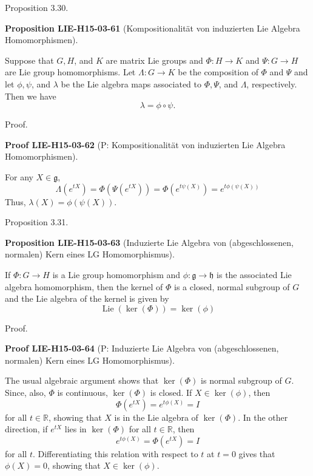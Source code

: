 \documentclass[10pt, letterpaper]{article}
\newcommand{\CustomHeading}[3]{%
  \par\medskip\noindent%
  \textbf{#1 #2} \textnormal{(#3)}.\enskip%
}
\newenvironment{PROP}[2]{\begin{unitbox}\CustomHeading{Proposition}{#1}{#2}}{\end{unitbox}}
\newenvironment{PROOF}[2]{\begin{unitbox}\CustomHeading{Proof}{#1}{#2}}{\end{unitbox}}
\begin{document}
Proposition 3.30. 


\begin{PROP}{LIE-H15-03-61}{Kompositionalität von induzierten Lie Algebra Homomorphismen}
Suppose that $G, H$, and $K$ are matrix Lie groups and $\Phi: H \rightarrow K$ and $\Psi: G \rightarrow H$ are Lie group homomorphisms. Let $\Lambda: G \rightarrow K$ be the composition of $\Phi$ and $\Psi$ and let $\phi, \psi$, and $\lambda$ be the Lie algebra maps associated to $\Phi, \Psi$, and $\Lambda$, respectively. Then we have
$$
\lambda=\phi \circ \psi .
$$
\end{PROP}



Proof. 


\begin{PROOF}{LIE-H15-03-62}{P: Kompositionalität von induzierten Lie Algebra Homomorphismen}
For any $X \in \mathfrak{g}$,
$$
\Lambda\left(e^{t X}\right)=\Phi\left(\Psi\left(e^{t X}\right)\right)=\Phi\left(e^{t \psi(X)}\right)=e^{t \phi(\psi(X))}
$$
Thus, $\lambda(X)=\phi(\psi(X))$.
\end{PROOF}


Proposition 3.31. 


\begin{PROP}{LIE-H15-03-63}{Induzierte Lie Algebra von (abgeschlossenen, normalen) Kern eines LG Homomorphismus}
If $\Phi: G \rightarrow H$ is a Lie group homomorphism and $\phi: \mathfrak{g} \rightarrow \mathfrak{h}$ is the associated Lie algebra homomorphism, then the kernel of $\Phi$ is a closed, normal subgroup of $G$ and the Lie algebra of the kernel is given by
$$
\operatorname{Lie}(\operatorname{ker}(\Phi))=\operatorname{ker}(\phi)
$$
\end{PROP}


Proof. 

\begin{PROOF}{LIE-H15-03-64}{P: Induzierte Lie Algebra von (abgeschlossenen, normalen) Kern eines LG Homomorphismus}
The usual algebraic argument shows that $\operatorname{ker}(\Phi)$ is normal subgroup of $G$. Since, also, $\Phi$ is continuous, $\operatorname{ker}(\Phi)$ is closed. If $X \in \operatorname{ker}(\phi)$, then
$$
\Phi\left(e^{t X}\right)=e^{t \phi(X)}=I
$$
for all $t \in \mathbb{R}$, showing that $X$ is in the Lie algebra of $\operatorname{ker}(\Phi)$. In the other direction, if $e^{t X}$ lies in $\operatorname{ker}(\Phi)$ for all $t \in \mathbb{R}$, then
$$
e^{t \phi(X)}=\Phi\left(e^{t X}\right)=I
$$
for all $t$. Differentiating this relation with respect to $t$ at $t=0$ gives that $\phi(X)=0$, showing that $X \in \operatorname{ker}(\phi)$.
\end{PROOF}
\end{document}
